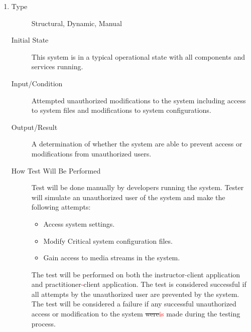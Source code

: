 \documentclass[12pt, titlepage]{article}
\newcommand{\rt}[1]{\textcolor{red}{#1}}
\begin{document}
\begin{enumerate}[NFR-T1]
\item \label{NFRT23}
  \begin{description}
  \item[Type] Structural, Dynamic, Manual
  \item[Initial State] This system is in a typical operational state with all
    components and services running.
  \item[Input/Condition] Attempted unauthorized modifications to the system
    including access to system files and modifications to system configurations.
  \item[Output/Result] A determination of whether the system are able to prevent
    access or modifications from unauthorized users.
  \item[How Test Will Be Performed] Test will be done manually by developers
    running the system. Tester will simulate an unauthorized user of the system
    and make the following attempts:
    \begin{itemize}
    \item Access system settings.
    \item Modify Critical system configuration files.
    \item Gain access to media streams in the system.
    \end{itemize}
    The test will be performed on both the instructor\rt{-}client application and
    practitioner\rt{-}client application. The test is considered successful if all
    attempts by the unauthorized user are prevented by the system. The test will
    be considered a failure if any successful unauthorized access or
    modification to the system \sout{were}\rt{is} made during the testing process.

\end{description}
\end{enumerate}
\end{document}
